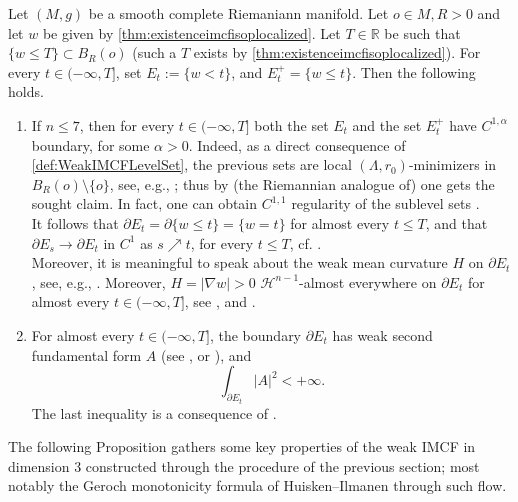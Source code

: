 \documentclass[a4paper,12pt,reqno]{amsart}
\numberwithin{equation}{section}
\theoremstyle{plain}
\theoremstyle{definition}
\theoremstyle{remark}
\newcommand{\R}{\mathbb{R}}
\begin{document}
{Let $(M,g)$ be a smooth complete Riemaniann manifold. Let $o\in M, R>0$ and let $w$ be given by \cref{thm:existenceimcfisoplocalized}. Let $T\in\R$ be such that $\{w \le T\} \subset B_R(o)$ (such a $T$ exists by \cref{thm:existenceimcfisoplocalized}).
For every $t\in (-\infty,T]$, set $E_t:=\{w<t\}$, and $E_t^+ = \{w \le t\}$.
Then the following holds.
    \begin{enumerate}
        \item If $n\le 7$, then for every $t\in (-\infty,T]$ both the set $E_t$ and the set $E_t^+$ have $C^{1,\alpha}$ boundary, for some $\alpha>0$. Indeed, as a direct consequence of \cref{def:WeakIMCFLevelSet}, the previous sets are local $(\Lambda,r_0)$-minimizers in $B_R(o)\setminus\{o\}$, see, e.g., \cite[Example 21.2]{MaggiBook}; thus by (the Riemannian analogue of) \cite[Theorem 21.8]{MaggiBook} one gets the sought claim. In fact, one can obtain $C^{1, 1}$ regularity of the sublevel sets \cite{Heidusch}.\\
        It follows that $\partial E_t = \partial \{ w \le t\}=\{w=t\}$ for almost every $t \le T$, and that $\partial E_s \to \partial E_t$ in $C^1$ as $s\nearrow t$, for every $t \le T$, cf. \cite[Eq. (1.10)]{HuiskenIlmanen}. \\
        Moreover, it is meaningful to speak about the weak mean curvature $H$ on $\partial E_t$, see, e.g., \cite[page 16]{HuiskenIlmanen}. Moreover, $H=|\nabla w|>0$ $\mathcal{H}^{n-1}$-almost everywhere on $\partial E_t$ for almost every $t\in (-\infty,T]$, see \cite[Equation (1.12)]{HuiskenIlmanen}, and \cite[Lemma 5.1]{HuiskenIlmanen}.
        
        \item For almost every $t\in (-\infty,T]$, the boundary $\partial E_t$ has weak second fundamental form $A$ (see \cite[Definition 1.3]{GerochMonotonicityMoser}, or \cite[pages 401--405]{HuiskenIlmanen}), and 
        \[
        \int_{\partial E_t} |A|^2<+\infty.
        \]
        The last inequality is a consequence of \cite[Theorem 1.1(vi)]{GerochMonotonicityMoser}.
        \end{enumerate}
The following Proposition gathers some key properties of the weak IMCF in dimension $3$ constructed through the procedure of the previous section; most notably the Geroch monotonicity formula of Huisken--Ilmanen through such flow.

}
\end{document}
